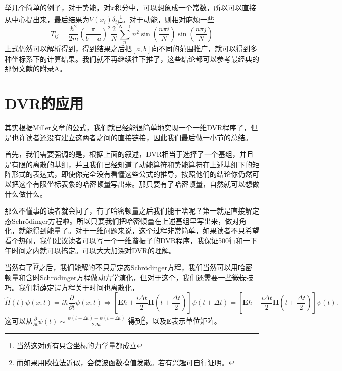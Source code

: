 \documentclass[12pt,a4paper,openany,twoside]{book}
\numberwithin{equation}{section}
\newcommand{\sch}{Schr\"odinger}
\begin{document}
        举几个简单的例子，对于势能，对$x$积分中，可以想象成一个常数，所以可以直接从中心提出来，最后结果为$V(x_i)\delta_{ij}$\footnote{当然这对所有只含坐标的力学量都成立}。对于动能，则相对麻烦一些
        \begin{equation}
          T_{ij}=\frac{\hbar^2}{2m}\left(\frac{\pi}{b-a}\right)^2\frac{2}{N}\sum_n^{N-1}n^2\sin\left(\frac{n\pi i}{N}\right)\sin\left(\frac{n\pi j}{N}\right)
        \end{equation}
        上式仍然可以解析得到，得到结果之后把$[a,b]$向不同的范围推广，就可以得到多种坐标系下的计算结果。我们就不再继续往下推了，这些结论都可以参考最经典的那份文献\cite{colbert1992novel}的附录A。
      \section{DVR的应用}
        其实根据Miller文章的公式，我们就已经能很简单地实现一个一维DVR程序了，但是也许读者还没有建立这两者之间的直接链接，因此我们最后做一小节的总结。

        首先，我们需要强调的是，根据上面的叙述，DVR相当于选择了一个基组，并且是有限的离散的基组，并且我们已经知道了动能算符和势能算符在上述基组下的矩阵形式的表达式，即使你完全没有看懂这些公式的推导，按照他们的结论你仍然可以把这个有限坐标表象的哈密顿量写出来。那只要有了哈密顿量，自然就可以想做什么做什么。
        
        那么不懂事的读者就会问了，有了哈密顿量之后我们能干啥呢？第一就是直接解定态\sch 方程啦。所以只要我们把哈密顿量在上述基组里写出来，做对角化，就能得到能量了。对于一维问题来说，这个过程非常简单，如果读者不只希望看个热闹，我们建议读者可以写一个一维谐振子的DVR程序，我保证500行和一下午时间之内就可以搞定。可以大大加深对DVR的理解。

        当然有了$\hat{H}$之后，我们能解的不只是定态\sch 方程，我们当然可以用哈密顿量和含时\sch 方程做动力学演化，但对于这个，我们还需要一些\sout{微操}技巧。我们将薛定谔方程关于时间也离散化，
        \[
      	  \hat{H}(t) \psi(x;t) = i \hbar \frac{\partial }{\partial t} \psi(x;t) \Rightarrow \left[\mathbf{E} \hbar + \frac{i \Delta t}{2} \mathbf{H}(t+\frac{\Delta t}{2})\right] \psi(t+ \Delta t) = \left[\mathbf{E} \hbar - \frac{i \Delta t}{2} \mathbf{H} (t+\frac{\Delta t}{2})\right] \psi(t)  
        .\] 
        这可以从$\frac{\partial }{\partial t} \psi(t) \sim \frac{\psi(t+ \Delta t) - \psi(t-\Delta t)}{2 \Delta t}$ 得到\footnote{而如果用欧拉法近似，会使波函数摸值发散。若有兴趣可自行证明。}，以及$\mathbf{E}$表示单位矩阵。
\end{document}
